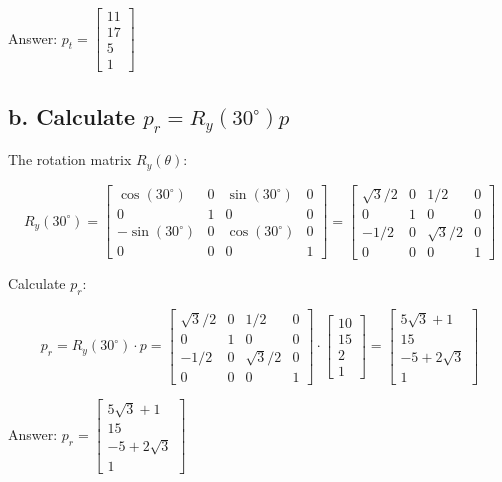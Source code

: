 \documentclass{article}
\begin{document}
Answer: $p_t = \begin{bmatrix} 11 \\ 17 \\ 5 \\ 1 \end{bmatrix}$

\subsection{b. Calculate $p_r = R_y(30^\circ)p$}

The rotation matrix $R_y(\theta)$:

$$
R_y(30^\circ) =
\begin{bmatrix}
\cos(30^\circ) & 0 & \sin(30^\circ) & 0 \\
0 & 1 & 0 & 0 \\
-\sin(30^\circ) & 0 & \cos(30^\circ) & 0 \\
0 & 0 & 0 & 1
\end{bmatrix}
=
\begin{bmatrix}
\sqrt{3}/2 & 0 & 1/2 & 0 \\
0 & 1 & 0 & 0 \\
-1/2 & 0 & \sqrt{3}/2 & 0 \\
0 & 0 & 0 & 1
\end{bmatrix}
$$

Calculate $p_r$:

$$
p_r = R_y(30^\circ) \cdot p =
\begin{bmatrix}
\sqrt{3}/2 & 0 & 1/2 & 0 \\
0 & 1 & 0 & 0 \\
-1/2 & 0 & \sqrt{3}/2 & 0 \\
0 & 0 & 0 & 1
\end{bmatrix}
\cdot
\begin{bmatrix}
10 \\ 15 \\ 2 \\ 1
\end{bmatrix}
=
\begin{bmatrix}
5\sqrt{3} + 1 \\ 15 \\ -5 + 2\sqrt{3} \\ 1
\end{bmatrix}
$$

Answer: $p_r = \begin{bmatrix} 5\sqrt{3} + 1 \\ 15 \\ -5 + 2\sqrt{3} \\ 1 \end{bmatrix}$
\end{document}

